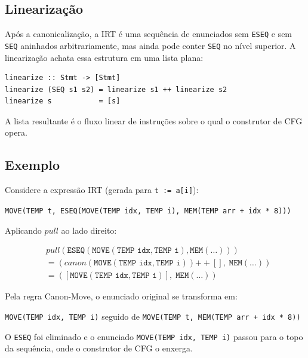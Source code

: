 \subsection{Linearização}

Após a canonicalização, a IRT é uma sequência de enunciados sem
\texttt{ESEQ} e sem \texttt{SEQ} aninhados arbitrariamente, mas ainda
pode conter \texttt{SEQ} no nível superior. A linearização achata essa
estrutura em uma lista plana:

\begin{verbatim}
linearize :: Stmt -> [Stmt]
linearize (SEQ s1 s2) = linearize s1 ++ linearize s2
linearize s           = [s]
\end{verbatim}

A lista resultante é o fluxo linear de instruções sobre o qual o
construtor de CFG opera.

\subsection{Exemplo}

Considere a expressão IRT (gerada para \texttt{t := a[i]}):

\begin{center}
  \texttt{MOVE(TEMP t, ESEQ(MOVE(TEMP idx, TEMP i), MEM(TEMP arr + idx * 8)))}
\end{center}

Aplicando $\mathit{pull}$ ao lado direito:

\begin{align*}
  &\mathit{pull}(\texttt{ESEQ}(\texttt{MOVE}(\texttt{TEMP idx},\texttt{TEMP i}),
  \texttt{MEM}(\ldots))) \\
  &= (\mathit{canon}(\texttt{MOVE}(\texttt{TEMP idx},\texttt{TEMP i}))
  \mathbin{+\!\!+} [], \; \texttt{MEM}(\ldots)) \\
  &= ([\texttt{MOVE}(\texttt{TEMP idx}, \texttt{TEMP i})], \;
  \texttt{MEM}(\ldots))
\end{align*}

Pela regra Canon-Move, o enunciado original se transforma em:

\begin{center}
  \texttt{MOVE(TEMP idx, TEMP i)} \quad seguido de \quad
  \texttt{MOVE(TEMP t, MEM(TEMP arr + idx * 8))}
\end{center}

O \texttt{ESEQ} foi eliminado e o enunciado \texttt{MOVE(TEMP idx, TEMP i)}
passou para o topo da sequência, onde o construtor de CFG o enxerga.

